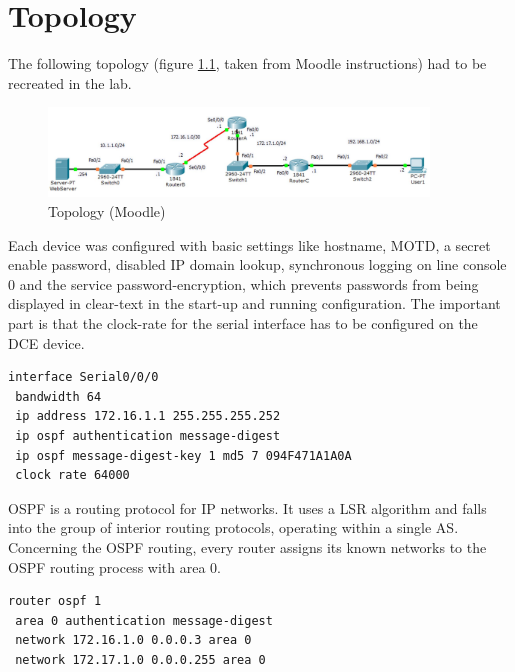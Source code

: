 
\chapter{Topology}

\thispagestyle{standard}
\pagestyle{standard}

The following topology (figure \ref{img:topo}, taken from Moodle instructions) had to be recreated in the lab.

\begin{figure}[H]
	\centering
	\includegraphics[width=0.9\textwidth]{img/topo.png}
	\caption{Topology (Moodle)}
	\label{img:topo}
\end{figure}

Each device was configured with basic settings like hostname, \ac{MOTD}, a secret enable password, disabled IP domain lookup, synchronous logging on line console 0 and the service password-encryption, which prevents passwords from being displayed in clear-text in the start-up and running configuration. The important part is that the clock-rate for the serial interface has to be configured on the \ac{DCE} device.

\begin{lstlisting}[caption={Setting the clock-rate on Router A},label={lst:clockrate},language={}]
interface Serial0/0/0
 bandwidth 64
 ip address 172.16.1.1 255.255.255.252
 ip ospf authentication message-digest
 ip ospf message-digest-key 1 md5 7 094F471A1A0A
 clock rate 64000
\end{lstlisting}

\ac{OSPF} is a routing protocol for \ac{IP} networks. It uses a \ac{LSR} algorithm and falls into the group of interior routing protocols, operating within a single \ac{AS}.
Concerning the \ac{OSPF} routing, every router assigns its known networks to the \ac{OSPF} routing process with area 0.
\newpage
{}%
\begin{lstlisting}[caption={\ac{OSPF} routing example router A},label={lst:ospf},language={}]
router ospf 1
 area 0 authentication message-digest
 network 172.16.1.0 0.0.0.3 area 0
 network 172.17.1.0 0.0.0.255 area 0
\end{lstlisting}

